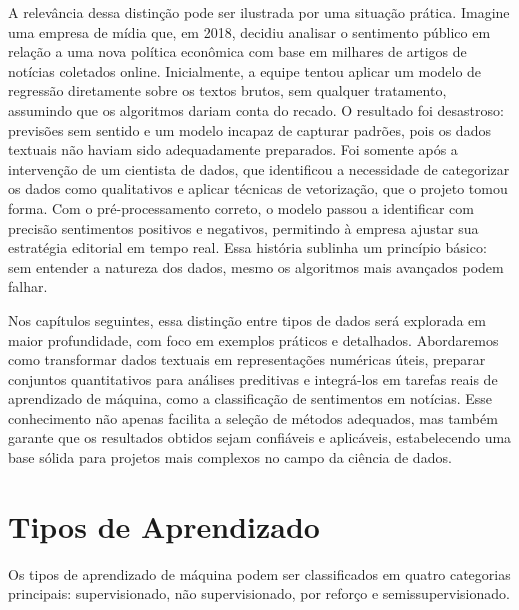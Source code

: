 \documentclass[a4paper,12pt,openany]{book}
\begin{document}
A relevância dessa distinção pode ser ilustrada por uma situação prática. Imagine uma empresa de mídia que, em 2018, decidiu analisar o sentimento público em relação a uma nova política econômica com base em milhares de artigos de notícias coletados online. Inicialmente, a equipe tentou aplicar um modelo de regressão diretamente sobre os textos brutos, sem qualquer tratamento, assumindo que os algoritmos dariam conta do recado. O resultado foi desastroso: previsões sem sentido e um modelo incapaz de capturar padrões, pois os dados textuais não haviam sido adequadamente preparados. Foi somente após a intervenção de um cientista de dados, que identificou a necessidade de categorizar os dados como qualitativos e aplicar técnicas de vetorização, que o projeto tomou forma. Com o pré-processamento correto, o modelo passou a identificar com precisão sentimentos positivos e negativos, permitindo à empresa ajustar sua estratégia editorial em tempo real. Essa história sublinha um princípio básico: sem entender a natureza dos dados, mesmo os algoritmos mais avançados podem falhar.

Nos capítulos seguintes, essa distinção entre tipos de dados será explorada em maior profundidade, com foco em exemplos práticos e detalhados. Abordaremos como transformar dados textuais em representações numéricas úteis, preparar conjuntos quantitativos para análises preditivas e integrá-los em tarefas reais de aprendizado de máquina, como a classificação de sentimentos em notícias. Esse conhecimento não apenas facilita a seleção de métodos adequados, mas também garante que os resultados obtidos sejam confiáveis e aplicáveis, estabelecendo uma base sólida para projetos mais complexos no campo da ciência de dados.

\section{Tipos de Aprendizado}
Os tipos de aprendizado de máquina podem ser classificados em quatro categorias principais: 
supervisionado, não supervisionado, por reforço e semissupervisionado.
\end{document}
